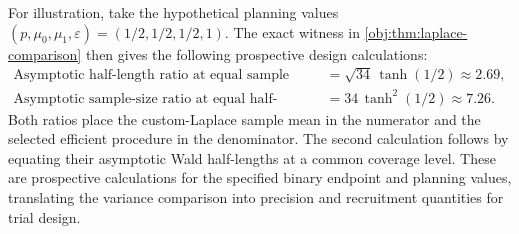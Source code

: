 For illustration, take the hypothetical planning values
\((p,\mu_0,\mu_1,\varepsilon)=(1/2,1/2,1/2,1)\).
The exact witness in \cref{obj:thm:laplace-comparison} then gives the following prospective design calculations:
\[
\begin{aligned}
\text{Asymptotic half-length ratio at equal sample size}
&=\sqrt{34}\,\tanh(1/2)
\approx 2.69,\\
\text{Asymptotic sample-size ratio at equal half-length}
&=34\,\tanh^2(1/2)
\approx 7.26.
\end{aligned}
\]
Both ratios place the custom-Laplace sample mean in the numerator and the selected efficient procedure in the denominator. The second calculation follows by equating their asymptotic Wald half-lengths at a common coverage level. These are prospective calculations for the specified binary endpoint and planning values, translating the variance comparison into precision and recruitment quantities for trial design.

